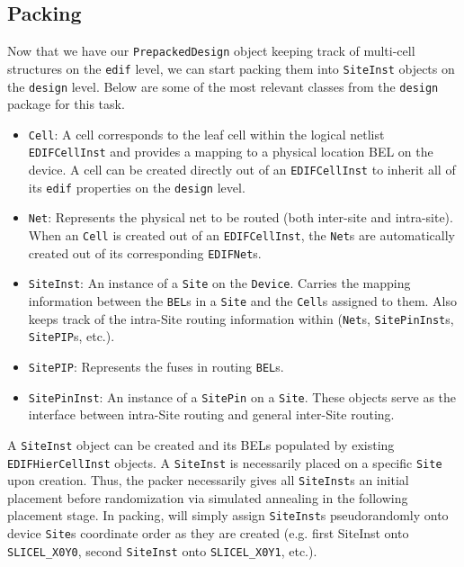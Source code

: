 \begin{multicols}{2}
\subsection{Packing}
\label{subsec:packing}
Now that we have our \texttt{PrepackedDesign} object keeping track of multi-cell structures on the \texttt{edif} level, we can start packing them into \texttt{SiteInst} objects on the \texttt{design} level. 
Below are some of the most relevant classes from the \texttt{design} package for this task.
\begin{itemize}
    \item \texttt{Cell}: A cell corresponds to the leaf cell within the logical netlist \texttt{EDIFCellInst} and provides a mapping to a physical location BEL on the device. A cell can be created directly out of an \texttt{EDIFCellInst} to inherit all of its \texttt{edif} properties on the \texttt{design} level.
    \item \texttt{Net}: Represents the physical net to be routed (both inter-site and intra-site). When an \texttt{Cell} is created out of an \texttt{EDIFCellInst}, the \texttt{Net}s are automatically created out of its corresponding \texttt{EDIFNet}s.
    \item \texttt{SiteInst}: An instance of a \texttt{Site} on the \texttt{Device}. Carries the mapping information between the \texttt{BEL}s in a \texttt{Site} and the \texttt{Cell}s assigned to them. Also keeps track of the intra-Site routing information within (\texttt{Net}s, \texttt{SitePinInst}s, \texttt{SitePIP}s, etc.).
    \item \texttt{SitePIP}: Represents the fuses in routing \texttt{BEL}s. 
    \item \texttt{SitePinInst}: An instance of a \texttt{SitePin} on a \texttt{Site}. These objects serve as the interface between intra-Site routing and general inter-Site routing. 
\end{itemize}
\columnbreak




A \texttt{SiteInst} object can be created and its BELs populated by existing \texttt{EDIFHierCellInst} objects. 
A \texttt{SiteInst} is necessarily placed on a specific \texttt{Site} upon creation. 
Thus, the packer necessarily gives all \texttt{SiteInst}s an initial placement before randomization via simulated annealing in the following placement stage. 
In packing, will simply assign \texttt{SiteInst}s pseudorandomly onto device \texttt{Site}s coordinate order as they are created (e.g. first SiteInst onto \texttt{SLICEL\_X0Y0}, second \texttt{SiteInst} onto \texttt{SLICEL\_X0Y1}, etc.). 


\end{multicols}
